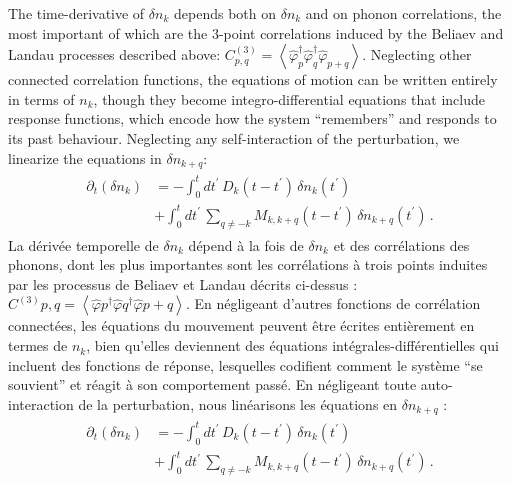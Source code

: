 \documentclass[aps,prd,notitlepage,amsfonts,amssymb,amsmath,nofootinbib,superscriptaddress,longbibliography]{revtex4-2}
\newcommand{\trad}[1]{\textcolor{tradcolor}{#1}}
\begin{document}
The time-derivative of $\delta n_{k}$ depends both on $\delta n_{k}$ and on phonon correlations, the most important of which are the 3-point correlations induced by the Beliaev and Landau processes described above: $C^{(3)}_{p,q} = \left\langle \hat{\varphi}_{p}^{\dagger} \hat{\varphi}_{q}^{\dagger} \hat{\varphi}_{p+q} \right\rangle$. Neglecting other connected correlation functions, the equations of motion can be written entirely in terms of $n_{k}$, though they become integro-differential equations that include response functions, which encode how the system ``remembers'' and responds to its past behaviour. Neglecting any self-interaction of the perturbation, we linearize the equations in $\delta n_{k+q}$:
\begin{align}
\begin{split}
\partial_{t}\left(\delta n_{k}\right) & = - \int_{0}^{t} dt^{\prime} \, D_{k}\left(t-t^{\prime}\right) \, \delta n_{k}\left(t^{\prime}\right) \\
& + \int_{0}^{t} dt^{\prime} \, \sum_{q \neq - k } M_{k,k+q}\left(t-t^{\prime}\right) \, \delta n_{k+q}\left(t^{\prime}\right) \,.
\label{eq:nk_eom_response_functions}
\end{split}
\end{align}
\trad{La dérivée temporelle de $\delta n_{k}$ dépend à la fois de $\delta n_{k}$ et des corrélations des phonons, dont les plus importantes sont les corrélations à trois points induites par les processus de Beliaev et Landau décrits ci-dessus : $C^{(3)}{p,q} = \left\langle \hat{\varphi}{p}^{\dagger} \hat{\varphi}{q}^{\dagger} \hat{\varphi}{p+q} \right\rangle$. En négligeant d'autres fonctions de corrélation connectées, les équations du mouvement peuvent être écrites entièrement en termes de $n_{k}$, bien qu'elles deviennent des équations intégrales-différentielles qui incluent des fonctions de réponse, lesquelles codifient comment le système ``se souvient'' et réagit à son comportement passé. En négligeant toute auto-interaction de la perturbation, nous linéarisons les équations en $\delta n_{k+q}$ :
\begin{align*}
\begin{split}
\partial_{t}\left(\delta n_{k}\right) & = - \int_{0}^{t} dt^{\prime} \, D_{k}\left(t-t^{\prime}\right) \, \delta n_{k}\left(t^{\prime}\right) \\
& + \int_{0}^{t} dt^{\prime} \, \sum_{q \neq - k } M_{k,k+q}\left(t-t^{\prime}\right) \, \delta n_{k+q}\left(t^{\prime}\right) \,.
\end{split}
\end{align*}
}
\end{document}
